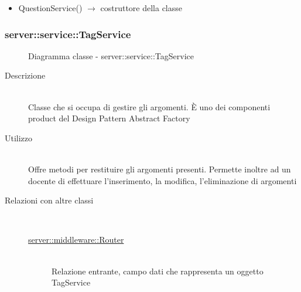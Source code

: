 \begin{description}
\begin{itemize}
	\item QuestionService() $\rightarrow$ costruttore della classe
\end{itemize}

\end{description}

\vspace{0.5cm}
\hypertarget{server::service::TagService}{}
\subsubsection[TagService]{server::service::TagService}
\begin{figure}[H]
	\centering
	\caption{Diagramma classe - server::service::TagService}
\end{figure}\begin{description}
\item[Descrizione] \hfill \\
Classe che si occupa di gestire gli argomenti. È uno dei componenti product del Design Pattern Abstract Factory
\item[Utilizzo] \hfill \\
Offre metodi per restituire gli argomenti presenti. Permette inoltre ad un docente di effettuare l'inserimento, la modifica, l'eliminazione di argomenti
\item[Relazioni con altre classi] \hfill \\
\vspace{-7mm}
\begin{description}
	\item[\hyperlink{server::middleware::Router}{server::middleware::Router}] \hfill \\
	Relazione entrante, campo dati che rappresenta un oggetto TagService
\end{description}


\end{description}
